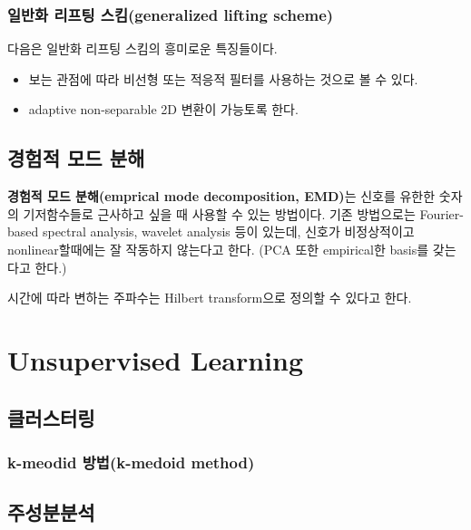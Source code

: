 \documentclass[b5paper,]{scrbook}
\theoremstyle{plain}
\theoremstyle{definition}
\numberwithin{equation}{section}
\begin{document}
\hypertarget{--generalized-lifting-scheme}{%
\section{일반화 리프팅 스킴(generalized lifting scheme)}\label{--generalized-lifting-scheme}}

다음은 일반화 리프팅 스킴의 흥미로운 특징들이다.

\begin{itemize}
\item
  보는 관점에 따라 비선형 또는 적응적 필터를 사용하는 것으로 볼 수 있다.
\item
  adaptive non-separable 2D 변환이 가능토록 한다.
\end{itemize}

\hypertarget{EMD}{%
\chapter{경험적 모드 분해}\label{EMD}}

\textbf{경험적 모드 분해(emprical mode decomposition, EMD)}는 신호를 유한한 숫자의 기저함수들로 근사하고 싶을 때 사용할 수 있는 방법이다. 기존 방법으로는 Fourier-based spectral analysis, wavelet analysis 등이 있는데, 신호가 비정상적이고 nonlinear할때에는 잘 작동하지 않는다고 한다. (PCA 또한 empirical한 basis를 갖는다고 한다.)

시간에 따라 변하는 주파수는 Hilbert transform으로 정의할 수 있다고 한다.

\hypertarget{part-unsupervised-learning}{%
\part{Unsupervised Learning}\label{part-unsupervised-learning}}

\hypertarget{clustering}{%
\chapter{클러스터링}\label{clustering}}

\hypertarget{k-meodid-k-medoid-method}{%
\section{k-meodid 방법(k-medoid method)}\label{k-meodid-k-medoid-method}}

\hypertarget{PCA}{%
\chapter{주성분분석}\label{PCA}}
\end{document}
